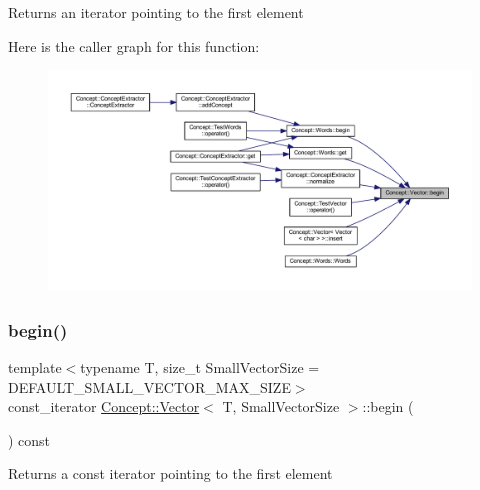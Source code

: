\begin{DoxyReturn}{Returns}
an iterator pointing to the first element 
\end{DoxyReturn}
Here is the caller graph for this function\+:\nopagebreak
\begin{figure}[H]
\begin{center}
\leavevmode
\includegraphics[width=350pt]{class_concept_1_1_vector_a118524e2ff65811ad0ad425153651a1f_icgraph}
\end{center}
\end{figure}
\mbox{\label{class_concept_1_1_vector_a0291fef67540e069d5b58d22f37f165f}} 
\subsubsection{\texorpdfstring{begin()}{begin()}\hspace{0.1cm}{\footnotesize\ttfamily [2/2]}}
{\footnotesize\ttfamily template$<$typename T, size\+\_\+t Small\+Vector\+Size = D\+E\+F\+A\+U\+L\+T\+\_\+\+S\+M\+A\+L\+L\+\_\+\+V\+E\+C\+T\+O\+R\+\_\+\+M\+A\+X\+\_\+\+S\+I\+ZE$>$ \\
const\+\_\+iterator \mbox{\hyperlink{class_concept_1_1_vector}{Concept\+::\+Vector}}$<$ T, Small\+Vector\+Size $>$\+::begin (\begin{DoxyParamCaption}{ }\end{DoxyParamCaption}) const\hspace{0.3cm}{\ttfamily [inline]}}

\begin{DoxyReturn}{Returns}
a const iterator pointing to the first element 
\end{DoxyReturn}
\mbox{\label{class_concept_1_1_vector_a7c6ea6d0b7df98242f2247c8d5184c5f}} 

